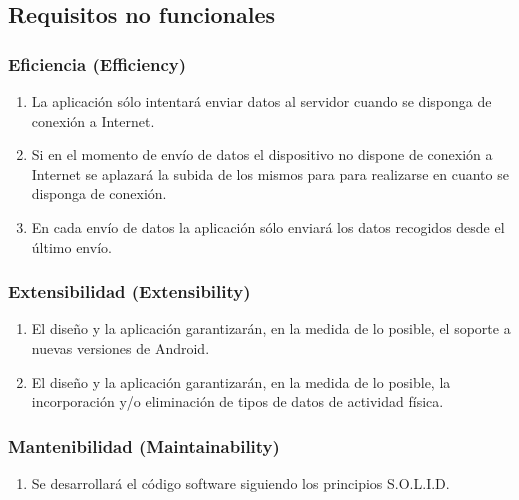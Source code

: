     
    \subsection{Requisitos no funcionales}
        \label{req:especificos:no_funcionales}
        \subsubsection{Eficiencia (Efficiency)}
            \begin{enumerate}[label=\textbf{\texttt{RNF-\arabic*}}]
                \item \label{req:no_funcionales:envio_internet} La aplicación sólo intentará enviar datos al servidor cuando se disponga de conexión a Internet.
                \item \label{req:no_funcionales:envio_aplazar} Si en el momento de envío de datos el dispositivo no dispone de conexión a Internet se aplazará la subida de los mismos para para realizarse en cuanto se disponga de conexión.
                \item \label{req:no_funcionales:envio_solo_ultimos} En cada envío de datos la aplicación sólo enviará los datos recogidos desde el último envío.
            \end{enumerate}
        \subsubsection{Extensibilidad (Extensibility)}
            \begin{enumerate}[resume, label=\textbf{\texttt{RNF-\arabic*}}]
                \item \label{req:no_funcionales:nuevas_versiones_android} El diseño y la aplicación garantizarán, en la medida de lo posible, el soporte a nuevas versiones de Android.
                \item \label{req:no_funcionales:nuevas_categorias_fisicas} El diseño y la aplicación garantizarán, en la medida de lo posible, la incorporación y/o eliminación de tipos de datos de actividad física.
            \end{enumerate}
        \subsubsection{Mantenibilidad (Maintainability)}
            \begin{enumerate}[resume, label=\textbf{\texttt{RNF-\arabic*}}]
                \item \label{req:no_funcionales:solid} Se desarrollará el código software siguiendo los principios S.O.L.I.D.
            \end{enumerate}
